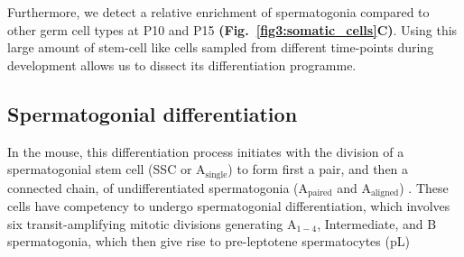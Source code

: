 Furthermore, we detect a relative enrichment of spermatogonia compared to other germ cell types at P10 and P15 \textbf{(Fig.~\ref{fig3:somatic_cells}C)}. Using this large amount of stem-cell like cells sampled from different time-points during development allows us to dissect its differentiation programme.

\newpage

\subsection{Spermatogonial differentiation}

In the mouse, this differentiation process initiates with the division of a spermatogonial stem cell (SSC or A$_{\text{single}}$) to form first a pair, and then a connected chain, of undifferentiated spermatogonia (A$_{\text{paired}}$ and A$_{\text{aligned}}$) \citep{Oakberg1971, DeRooij1973}. These cells have competency to undergo spermatogonial differentiation, which involves six transit-amplifying mitotic divisions generating A$_{1-4}$, Intermediate, and B spermatogonia, which then give rise to pre-leptotene spermatocytes (pL) \citep{DeRooij2000}

